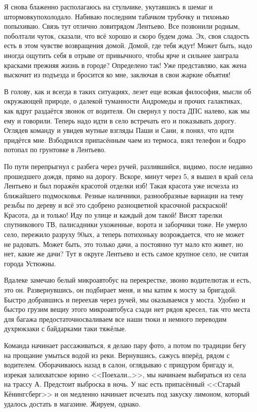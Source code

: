 Я снова блаженно располагаюсь на стульчике, укутавшись в шемаг и штормовку\mdash похолодало. Набиваю последним табачком трубочку и тихонько попыхиваю. Связь тут отлично ловит\mdash рядом Лентьево. Все позвонили родным, поболтали чуток, сказали, что всё хорошо и скоро будем дома. Эх, своя сладость есть в этом чувстве возвращения домой. Домой, где тебя ждут! Может быть, надо иногда ощутить себя в отрыве от привычного, чтобы ярче и сильнее заиграла красками прежняя жизнь в городе? Определено так! Уже представляю, как жена выскочит из подъезда и бросится ко мне, заключая в свои жаркие объятия!

В голову, как и всегда в таких ситуациях, лезет еще всякая философия, мысли об окружающей природе, о далекой туманности Андромеды и прочих галактиках, как вдруг раздаётся звонок от водителя. Он свернул у поста ДПС налево, как мы ему и говорили. Теперь надо идти в село встречать его и показывать дорогу. Оглядев команду и увидев мутные взгляды Паши и Сани, я понял, что идти придётся мне. Взбодрился припасённым чаем из термоса, взял телефон и бодро потопал по грунтовке в Лентьево. 
 
По пути перепрыгнул с разбега через ручей, разлившийся, видимо, после недавно прошедшего дождя, прямо на дорогу. Вскоре, минут через 5, я вышел в край села Лентьево и был поражён красотой отделки изб! Такая красота уже исчезла из ближайшего подмосковья. Резные наличники, разнообразные вариации на тему резьбы по дереву и всё это сдобрено разноцветной красочной раскраской! Красота, да и только! Иду по улице и каждый дом такой! Висят тарелки спутникового ТВ, палисадники ухоженные, ворота и заборчики тоже. Не умерло село, пережило разруху 90\sdash ых, а теперь потихоньку возрождается, что не может не радовать. Может быть, это только дачи, а постоянно тут мало кто живет, но нет, какие же дачи? Тут в округе Лентьево и есть самое крупное село, не считая города Устюжны.

Вдалеке замечаю белый микроавтобус на перекрестке, звоню водителю\mdash так и есть, это он. Развернувшись, он подбирает меня, и мы катим к мосту за бригадой. Быстро добравшись и переехав через ручей, мы оказываемся у моста. Удобно и быстро грузим вещи\mdash у этого микроавтобуса сзади нет рядов кресел, так что места для багажа предостаточно\mdash сваливаем все наши тюки и немного переводим дух\mdash рюкзаки с байдарками таки тяжёлые. 

Команда начинает рассаживаться, я делаю пару фото, а потом по традиции бегу на прощание умыться водой из реки. Вернувшись, сажусь вперёд, рядом с водителем. Оборачиваюсь назад в салон, оглядываю с прищуром бригаду и, изрекая залихватское юрино <<Поехали\ldots>>, мы начинаем выбираться из села на трассу А. Предстоит выброска в ночь. У нас есть припасённый <<Старый Кёнингсберг>> и он медленно начинает исчезать под закуску лимоном, который удалось достать в магазине. Жируем, однако.

